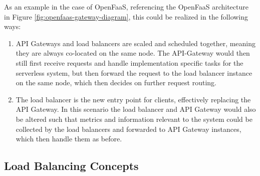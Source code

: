 As an example in the case of OpenFaaS, referencing the OpenFaaS architecture in Figure \ref{fig:openfaas-gateway-diagram}, this could be realized in the following ways:
\begin{enumerate}
    \item API Gateways and load balancers are scaled and scheduled together, meaning they are always co-located on the same node. The API-Gateway would then still first receive requests and handle implementation specific tasks for the serverless system, but then forward the request to the load balancer instance on the same node, which then decides on further request routing.
    \item The load balancer is the new entry point for clients, effectively replacing the API Gateway. In this scenario the load balancer and API Gateway would also be altered such that metrics and information relevant to the system could be collected by the load balancers and forwarded to API Gateway instances, which then handle them as before.
\end{enumerate}

\subsection{Load Balancing Concepts}
